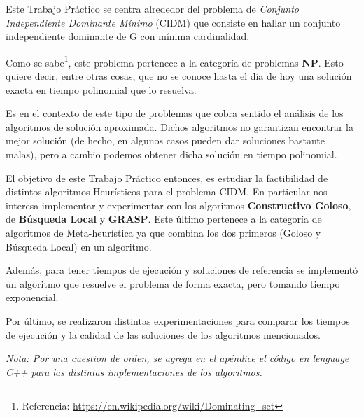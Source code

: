 Este Trabajo Práctico se centra alrededor del problema de \textit{Conjunto Independiente Dominante Mínimo} (CIDM) que consiste en hallar un conjunto
independiente dominante de G con mínima cardinalidad.

Como se sabe\footnote{Referencia: \url{https://en.wikipedia.org/wiki/Dominating_set}}, este problema pertenece a la categoría de problemas \textbf{NP}. Esto quiere decir, entre otras cosas, que no se conoce hasta el día de hoy una solución exacta en tiempo polinomial que lo resuelva.

Es en el contexto de este tipo de problemas que cobra sentido el análisis de los algoritmos de solución aproximada. Dichos algoritmos no garantizan encontrar la mejor solución (de hecho, en algunos casos pueden dar soluciones bastante malas), pero a cambio podemos obtener dicha solución en tiempo polinomial.

El objetivo de este Trabajo Práctico entonces, es estudiar la factibilidad de distintos algoritmos Heurísticos para el problema CIDM. En particular nos interesa implementar y experimentar con los algoritmos \textbf{Constructivo Goloso}, de \textbf{Búsqueda Local} y \textbf{GRASP}. Este último pertenece a la categoría de algoritmos de Meta-heurística ya que combina los dos primeros (Goloso y Búsqueda Local) en un algoritmo.

Además, para tener tiempos de ejecución y soluciones de referencia se implementó un algoritmo que resuelve el problema de forma exacta, pero tomando tiempo exponencial.

Por último, se realizaron distintas experimentaciones para comparar los tiempos de ejecución y la calidad de las soluciones de los algoritmos mencionados.

\medskip

\textit{Nota: Por una cuestion de orden, se agrega en el apéndice el código en lenguage C++ para las distintas implementaciones de los algoritmos.}
